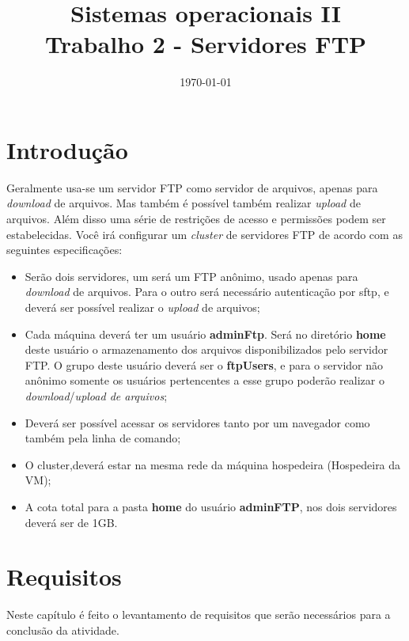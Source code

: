 \documentclass[
	12pt,				%
	openright,			%
	twoside,			%
	openany,			%
	a4paper,			%
	chapter=TITLE,		%
	section=TITLE,		%
	subsection=TITLE,	%
	subsubsection=TITLE,%
	english,
	brazil				%
]{abntex2}
\title{Sistemas operacionais II \\ Trabalho 2 - Servidores FTP}
\date{\today}
\begin{document}
\maketitle

\newpage
\tableofcontents
\newpage
\listoffigures


\chapter{Introdução}

Geralmente usa-se um servidor FTP como servidor de arquivos, apenas para \textit{download} de arquivos. Mas também é possível também realizar \textit{upload} de arquivos. Além disso uma série de restrições de acesso e permissões podem ser estabelecidas. Você irá configurar um \textit{cluster} de servidores FTP de acordo com as seguintes especificações:

\begin{itemize}
	\item Serão dois servidores, um será um FTP anônimo, usado apenas para \textit{download} de arquivos. Para o outro será necessário autenticação por sftp, e deverá ser possível realizar o \textit{upload} de arquivos;
	\item Cada máquina deverá ter um usuário \textbf{adminFtp}. Será no diretório \textbf{home} deste usuário o armazenamento dos arquivos disponibilizados pelo servidor FTP. O grupo deste usuário deverá ser o \textbf{ftpUsers}, e para o servidor não anônimo somente os usuários pertencentes a esse grupo poderão realizar o \textit{download}/\textit{upload de arquivos};
	\item Deverá ser possível acessar os servidores tanto por um navegador como também pela linha de comando;
	\item O cluster,deverá estar na mesma rede da máquina hospedeira (Hospedeira da VM);
	\item A cota total para a pasta \textbf{home} do usuário \textbf{adminFTP}, nos dois servidores deverá ser de 1GB. 
\end{itemize}

\chapter{Requisitos}

Neste capítulo é feito o levantamento de requisitos que serão necessários para a conclusão da atividade.
\end{document}
